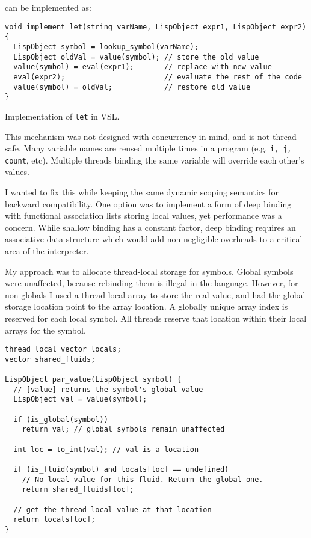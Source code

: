 can be implemented as:

\begin{code}
\begin{verbatim}
void implement_let(string varName, LispObject expr1, LispObject expr2) {
  LispObject symbol = lookup_symbol(varName);
  LispObject oldVal = value(symbol); // store the old value
  value(symbol) = eval(expr1);       // replace with new value
  eval(expr2);                       // evaluate the rest of the code
  value(symbol) = oldVal;            // restore old value
}
\end{verbatim}
\caption{Implementation of \texttt{let} in VSL.}
\label{code:let-vsl}
\end{code}

This mechanism was not designed with concurrency in mind, and is not thread-safe.
Many variable names are reused multiple times in a program (e.g. \texttt{i, j, count}, etc).
Multiple threads binding the same variable will override each other's values.

I wanted to fix this while keeping the same dynamic scoping semantics for backward compatibility.
One option was to implement a form of deep binding with functional association lists storing local values,
yet performance was a concern. While shallow binding has a constant factor, deep binding requires
an associative data structure which would add non-negligible overheads to a critical area of the
interpreter.

My approach was to allocate thread-local storage for symbols.
Global symbols were unaffected, because rebinding them is illegal in the language.
However, for non-globals I used a thread-local array to store the real value, and had the global storage
location point to the array location. A globally unique array index is reserved for each local symbol.
All threads reserve that location within their local arrays for the symbol.

\begin{verbatim}
thread_local vector locals;
vector shared_fluids;

LispObject par_value(LispObject symbol) {
  // [value] returns the symbol's global value
  LispObject val = value(symbol);

  if (is_global(symbol))
    return val; // global symbols remain unaffected

  int loc = to_int(val); // val is a location

  if (is_fluid(symbol) and locals[loc] == undefined)
    // No local value for this fluid. Return the global one.
    return shared_fluids[loc];

  // get the thread-local value at that location
  return locals[loc];
}
\end{verbatim}

